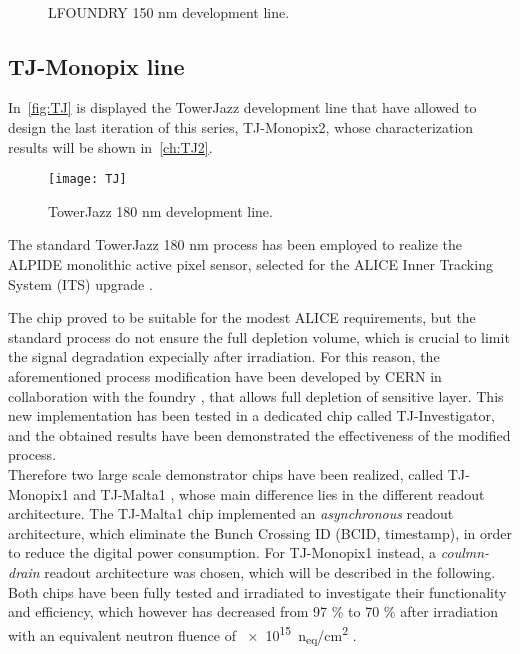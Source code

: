 \begin{figure}[h!]
\centering
\subfigure[CCPD\_LF]
{\texttt{[image: LF1]}}\quad
\subfigure[LF-CPIX]
{\texttt{[image: LF2]}}\quad
\subfigure[LF-MONOPIX 1]
{\texttt{[image: LF3]}}\\
\caption{LFOUNDRY 150 nm development line.}
\label{fig:LF}
\end{figure}


\subsection{TJ-Monopix line} \label{sec:TJ}

In~\autoref{fig:TJ} is displayed the TowerJazz development line that have allowed to design the last iteration of this series, TJ-Monopix2, whose characterization results will be shown in~\autoref{ch:TJ2}.\\

\begin{figure}[h!]
\centering
\texttt{[image: TJ]}
\caption{TowerJazz 180 nm development line.}
\label{fig:TJ}
\end{figure}

The standard TowerJazz 180 nm process has been employed to realize the ALPIDE monolithic active pixel sensor, selected for the ALICE Inner Tracking System (ITS) upgrade \cite{ALICE:2013nwm}.

The chip proved to be suitable for the modest ALICE requirements, but the standard process do not ensure the full depletion volume, which is crucial to limit the signal degradation expecially after irradiation. For this reason, the aforementioned process modification have been developed by CERN in collaboration with the foundry \cite{SNOEYS201790}, that allows full depletion of sensitive layer. This new implementation has been tested in a dedicated chip called TJ-Investigator, and the obtained results have been demonstrated the effectiveness of the modified process. \\
Therefore two large scale demonstrator chips have been realized, called TJ-Monopix1 and TJ-Malta1 \cite{Moustakas:2017qqw}, whose main difference lies in the different readout architecture. The TJ-Malta1 chip implemented an \textit{asynchronous} readout architecture, which eliminate the Bunch Crossing ID (BCID, timestamp), in order to reduce the digital power consumption. For TJ-Monopix1 instead, a \textit{coulmn-drain} readout architecture was chosen, which will be described in the following. Both chips have been fully tested and irradiated to investigate their functionality and efficiency, which however has decreased from 97 \% to 70 \% after irradiation with an equivalent neutron fluence of \SI{e15}{n_{eq}/cm^{2}} \cite{Caicedo:2019lrk}. 

